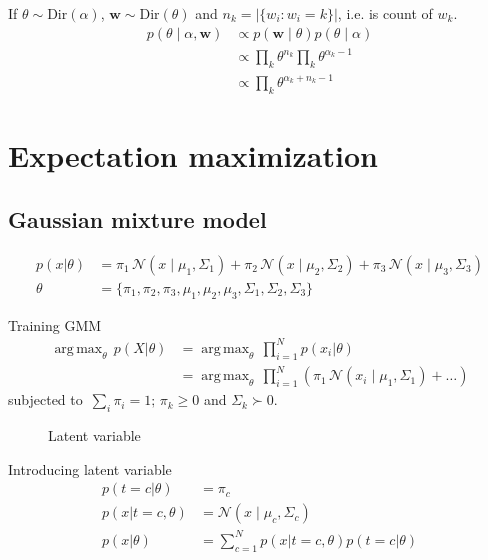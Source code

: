 \documentclass{book}
\DeclareMathOperator*{\argmax}{arg\,max}
\begin{document}
If $\theta \sim \text{Dir}(\alpha)$, $\mathbf{w} \sim \text{Dir}(\theta)$ and $n_k = \lvert{\{w_i: w_i =k \}}\rvert$, i.e. is count of $w_k$. 
\begin{align*}
p(\theta \mid \alpha, \mathbf{w}) &\propto p(\mathbf{w} \mid \theta) p(\theta \mid \alpha) \\
&\propto \prod_{k} {\theta}^{n_k} \prod_{k} {\theta}^{\alpha_k -1} \\
&\propto \prod_{k} {\theta}^{\alpha_k + n_k -1}
\end{align*}

\section{Expectation maximization}

\subsection{Gaussian mixture model}
\begin{align*}
p(x | \theta) &= \pi_1 \, \mathcal{N}(x\mid \mu_1 ,\Sigma_1) + \pi_2 \, \mathcal{N}(x\mid \mu_2 ,\Sigma_2) + \pi_3 \, \mathcal{N}(x\mid \mu_3 ,\Sigma_3) \\
\theta &= \{ \pi_1, \pi_2, \pi_3, \mu_1, \mu_2, \mu_3, \Sigma_1, \Sigma_2, \Sigma_3 \}
\end{align*}

Training GMM
\begin{align*}
\argmax_{\theta} \, p(X | \theta) &= \argmax_{\theta} \, \prod_{i=1}^{N}  p(x_i | \theta) \\
&= \argmax_{\theta} \, \prod_{i=1}^{N} ( \pi_1 \, \mathcal{N}(x_i\mid \mu_1 ,\Sigma_1) + \dots )
\end{align*}
subjected to $\, \sum_i \pi_i = 1; \, \pi_k \geq 0$ and $\Sigma_k \succ 0$.

\begin{figure}[h]
\centering
\caption{Latent variable}
\end{figure}

Introducing latent variable
\begin{align*}
p(t=c | \theta) &= \pi_c \\
p(x | t=c, \theta) &= \mathcal{N}(x\mid \mu_c ,\Sigma_c) \\
p(x | \theta) &= \sum_{c=1}^{N} p(x | t=c, \theta)p(t=c | \theta) 
\end{align*}
\end{document}
